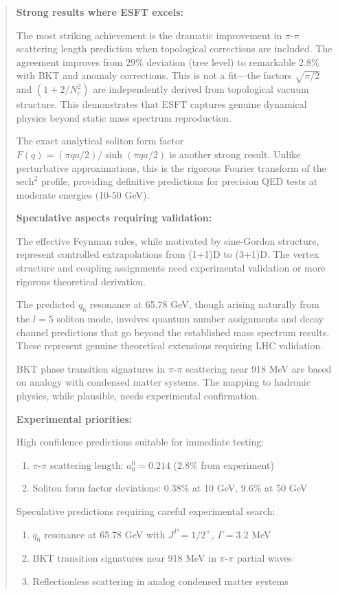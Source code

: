 ﻿\documentclass[twocolumn,prd,amsmath,amssymb,aps]{revtex4-2}
\begin{document}
\begin{abstract}
\textbf{Strong results where ESFT excels:}

The most striking achievement is the dramatic improvement in $\pi$-$\pi$ scattering length prediction when topological corrections are included. The agreement improves from 29\% deviation (tree level) to remarkable 2.8\% with BKT and anomaly corrections. This is not a fit---the factors $\sqrt{\pi/2}$ and $(1 + 2/N_c^2)$ are independently derived from topological vacuum structure. This demonstrates that ESFT captures genuine dynamical physics beyond static mass spectrum reproduction.

The exact analytical soliton form factor $F(q) = (\pi qa/2)/\sinh(\pi qa/2)$ is another strong result. Unlike perturbative approximations, this is the rigorous Fourier transform of the $\text{sech}^2$ profile, providing definitive predictions for precision QED tests at moderate energies (10-50 GeV).

\textbf{Speculative aspects requiring validation:}

The effective Feynman rules, while motivated by sine-Gordon structure, represent controlled extrapolations from (1+1)D to (3+1)D. The vertex structure and coupling assignments need experimental validation or more rigorous theoretical derivation.

The predicted $q_6$ resonance at 65.78 GeV, though arising naturally from the $l=5$ soliton mode, involves quantum number assignments and decay channel predictions that go beyond the established mass spectrum results. These represent genuine theoretical extensions requiring LHC validation.

BKT phase transition signatures in $\pi$-$\pi$ scattering near 918 MeV are based on analogy with condensed matter systems. The mapping to hadronic physics, while plausible, needs experimental confirmation.

\textbf{Experimental priorities:}

High confidence predictions suitable for immediate testing:
\begin{enumerate}
\item $\pi$-$\pi$ scattering length: $a_0^0 = 0.214$ (2.8\% from experiment)
\item Soliton form factor deviations: 0.38\% at 10 GeV, 9.6\% at 50 GeV
\end{enumerate}

Speculative predictions requiring careful experimental search:
\begin{enumerate}
\item $q_6$ resonance at 65.78 GeV with $J^P = 1/2^+$, $\Gamma = 3.2$ MeV
\item BKT transition signatures near 918 MeV in $\pi$-$\pi$ partial waves 
\item Reflectionless scattering in analog condensed matter systems
\end{enumerate}


\end{abstract}
\end{document}
